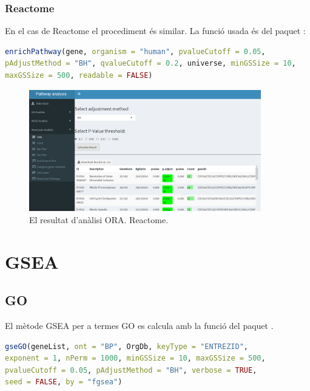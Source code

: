 \subsubsection{Reactome}
En el cas de Reactome el procediment és similar. La funció usada és  del paquet :

\begin{lstlisting}[language=R]
enrichPathway(gene, organism = "human", pvalueCutoff = 0.05,
pAdjustMethod = "BH", qvalueCutoff = 0.2, universe, minGSSize = 10,
maxGSSize = 500, readable = FALSE)
\end{lstlisting}


\begin{figure}[H]
\centering
\includegraphics[width=0.9\textwidth]{App_F10_Items_Reactome_ORA.png} 
\caption{El resultat d'anàlisi ORA. Reactome.}
\end{figure}

\section{GSEA}
\subsection{GO}
El mètode GSEA per a termes GO es calcula amb la funció  del paquet . 

\begin{lstlisting}[language=R]
gseGO(geneList, ont = "BP", OrgDb, keyType = "ENTREZID",
exponent = 1, nPerm = 1000, minGSSize = 10, maxGSSize = 500,
pvalueCutoff = 0.05, pAdjustMethod = "BH", verbose = TRUE,
seed = FALSE, by = "fgsea")
\end{lstlisting}

